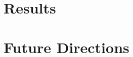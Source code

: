 \documentclass[12pt]{article}
\begin{document}
\section{Results}


\section{Future Directions}





\nocite{*}

\end{document}
